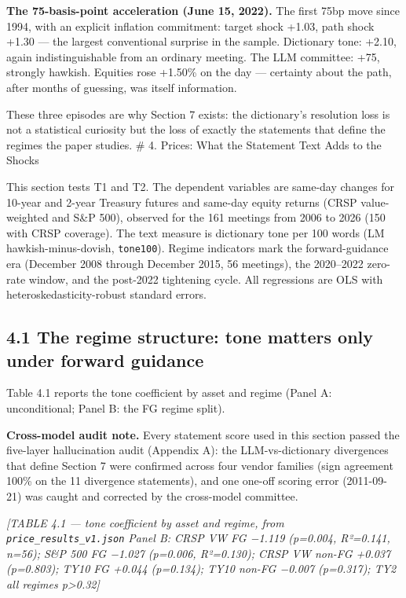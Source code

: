 \textbf{The 75-basis-point acceleration (June 15, 2022).} The first 75bp move since 1994, with an explicit inflation commitment: target shock +1.03, path shock +1.30 --- the largest conventional surprise in the sample. Dictionary tone: +2.10, again indistinguishable from an ordinary meeting. The LLM committee: +75, strongly hawkish. Equities rose +1.50\% on the day --- certainty about the path, after months of guessing, was itself information.

These three episodes are why Section 7 exists: the dictionary's resolution loss is not a statistical curiosity but the loss of exactly the statements that define the regimes the paper studies. \# 4. Prices: What the Statement Text Adds to the Shocks

This section tests T1 and T2. The dependent variables are same-day changes for 10-year and 2-year Treasury futures and same-day equity returns (CRSP value-weighted and S\&P 500), observed for the 161 meetings from 2006 to 2026 (150 with CRSP coverage). The text measure is dictionary tone per 100 words (LM hawkish-minus-dovish, \texttt{tone100}). Regime indicators mark the forward-guidance era (December 2008 through December 2015, 56 meetings), the 2020--2022 zero-rate window, and the post-2022 tightening cycle. All regressions are OLS with heteroskedasticity-robust standard errors.

\subsection{4.1 The regime structure: tone matters only under forward guidance}\label{the-regime-structure-tone-matters-only-under-forward-guidance}

Table 4.1 reports the tone coefficient by asset and regime (Panel A: unconditional; Panel B: the FG regime split).

\textbf{Cross-model audit note.} Every statement score used in this section passed the five-layer hallucination audit (Appendix A): the LLM-vs-dictionary divergences that define Section 7 were confirmed across four vendor families (sign agreement 100\% on the 11 divergence statements), and one one-off scoring error (2011-09-21) was caught and corrected by the cross-model committee.

\emph{{[}TABLE 4.1 --- tone coefficient by asset and regime, from \texttt{price\_results\_v1.json} Panel B: CRSP VW FG −1.119 (p=0.004, R²=0.141, n=56); S\&P 500 FG −1.027 (p=0.006, R²=0.130); CRSP VW non-FG +0.037 (p=0.803); TY10 FG +0.044 (p=0.134); TY10 non-FG −0.007 (p=0.317); TY2 all regimes p\textgreater0.32{]}}


